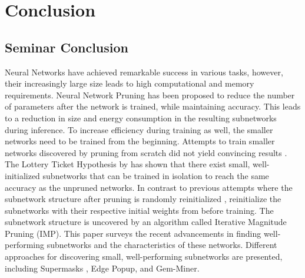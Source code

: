 \chapter{Conclusion}


\section{Seminar Conclusion}
Neural Networks have achieved remarkable success in various tasks, however, their increasingly large size leads to high computational and memory requirements.
Neural Network Pruning \autocite{LeCun, OptimalBrainSurgeon, HanEtAl15, PruningFiltersForEfficientConvets} has been proposed to reduce the number of parameters after the network is trained, while maintaining accuracy.
This leads to a reduction in size \autocite{HanEtAl15} and energy consumption \autocite{YangCS17} in the resulting subnetworks during inference.
To increase efficiency during training as well, the smaller networks need to be trained from the beginning. Attempts to train smaller networks discovered by pruning from scratch did not yield convincing results \autocite{HanEtAl15, PruningFiltersForEfficientConvets}.
The Lottery Ticket Hypothesis by \textcite{DBLP:conf/iclr/FrankleC19} has shown that there exist small, well-initialized subnetworks that can be trained in isolation to reach the same accuracy as the unpruned networks. 
In contrast to previous attempts where the subnetwork structure after pruning is randomly reinitialized \autocite{HanEtAl15, PruningFiltersForEfficientConvets}, \textcite{DBLP:conf/iclr/FrankleC19} reinitialize the subnetworks with their respective initial weights from before training.
The subnetwork structure is uncovered by an algorithm called Iterative Magnitude Pruning (IMP).
This paper surveys the recent advancements in finding well-performing subnetworks and the characteristics of these networks. Different approaches for discovering small, well-performing subnetworks are presented, including Supermasks \autocite{DBLP:conf/nips/ZhouLLY19}, Edge Popup\autocite{DBLP:conf/cvpr/RamanujanWKFR20}, and Gem-Miner\autocite{RareGems}.